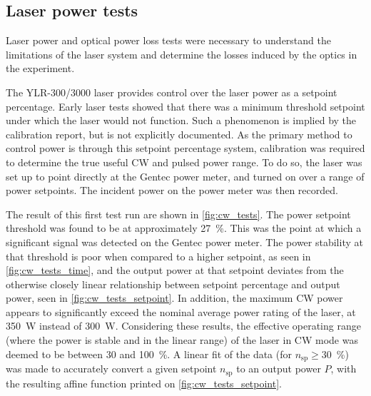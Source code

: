 
        \subsection{Laser power tests}
            Laser power and optical power loss tests were necessary to understand the limitations of the laser system and determine the losses induced by the optics in the experiment.

            The YLR-300/3000 laser provides control over the laser power as a setpoint percentage. Early laser tests showed that there was a minimum threshold setpoint under which the laser would not function. Such a phenomenon is implied by the calibration report, but is not explicitly documented. As the primary method to control power is through this setpoint percentage system, calibration was required to determine the true useful CW and pulsed power range. To do so, the laser was set up to point directly at the Gentec power meter, and turned on over a range of power setpoints. The incident power on the power meter was then recorded.

            The result of this first test run are shown in \autoref{fig:cw_tests}. The power setpoint threshold was found to be at approximately 27~\%. This was the point at which a significant signal was detected on the Gentec power meter. The power stability at that threshold is poor when compared to a higher setpoint, as seen in \autoref{fig:cw_tests_time}, and the output power at that setpoint deviates from the otherwise closely linear relationship between setpoint percentage and output power, seen in \autoref{fig:cw_tests_setpoint}. In addition, the maximum CW power appears to significantly exceed the nominal average power rating of the laser, at \qty{350}{W} instead of \qty{300}{W}. Considering these results, the effective operating range (where the power is stable and in the linear range) of the laser in CW mode was deemed to be between 30 and 100~\%. A linear fit of the data (for $n_\mathrm{sp} \geq 30$~\%) was made to accurately convert a given setpoint $n_\mathrm{sp}$ to an output power $P$, with the resulting affine function printed on \autoref{fig:cw_tests_setpoint}.


